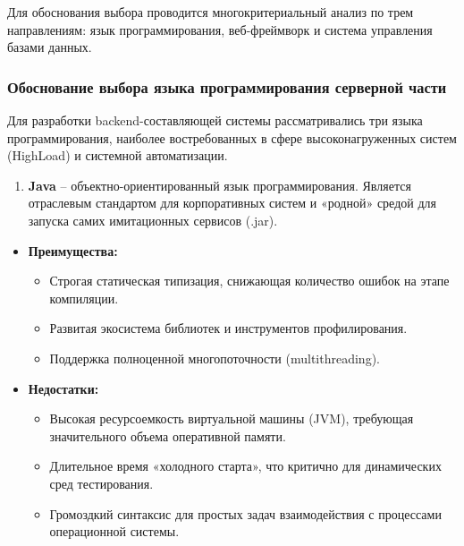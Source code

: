 \documentclass[
]{article}
\begin{document}
Для обоснования выбора проводится многокритериальный анализ по трем
направлениям: язык программирования, веб-фреймворк и система управления
базами данных.

\subsubsection{Обоснование выбора языка программирования серверной
части}\label{ux43eux431ux43eux441ux43dux43eux432ux430ux43dux438ux435-ux432ux44bux431ux43eux440ux430-ux44fux437ux44bux43aux430-ux43fux440ux43eux433ux440ux430ux43cux43cux438ux440ux43eux432ux430ux43dux438ux44f-ux441ux435ux440ux432ux435ux440ux43dux43eux439-ux447ux430ux441ux442ux438}

Для разработки backend-составляющей системы рассматривались три языка
программирования, наиболее востребованных в сфере высоконагруженных
систем (HighLoad) и системной автоматизации.

\begin{enumerate}
\def\labelenumi{\arabic{enumi}.}
\item
  \textbf{Java} -- объектно-ориентированный язык программирования.
  Является отраслевым стандартом для корпоративных систем и «родной»
  средой для запуска самих имитационных сервисов (.jar).
\end{enumerate}

\begin{itemize}
\item
  \textbf{Преимущества:}

  \begin{itemize}
  \item
    Строгая статическая типизация, снижающая количество ошибок на этапе
    компиляции.
  \item
    Развитая экосистема библиотек и инструментов профилирования.
  \item
    Поддержка полноценной многопоточности (multithreading).
  \end{itemize}
\item
  \textbf{Недостатки:}

  \begin{itemize}
  \item
    Высокая ресурсоемкость виртуальной машины (JVM), требующая
    значительного объема оперативной памяти.
  \item
    Длительное время «холодного старта», что критично для динамических
    сред тестирования.
  \item
    Громоздкий синтаксис для простых задач взаимодействия с процессами
    операционной системы.
  \end{itemize}
\end{itemize}
\end{document}
